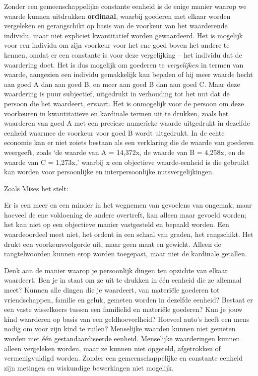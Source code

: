 Zonder een gemeenschappelijke constante eenheid is de enige manier waarop we waarde kunnen uitdrukken \textbf{ordinaal}, waarbij goederen met elkaar worden vergeleken en gerangschikt op basis van de voorkeur van het waarderende individu, maar niet expliciet kwantitatief worden gewaardeerd. Het is mogelijk voor een individu om zijn voorkeur voor het ene goed boven het andere te kennen, omdat er een constante is voor deze vergelijking – het individu dat de waardering doet. Het is dus mogelijk om goederen te \textit{vergelijken} in termen van waarde, aangezien een individu gemakkelijk kan bepalen of hij meer waarde hecht aan goed A dan aan goed B, en meer aan goed B dan aan goed C. Maar deze waardering is puur subjectief, uitgedrukt in verhouding tot het nut dat de persoon die het waardeert, ervaart. Het is onmogelijk voor de persoon om deze voorkeuren in kwantitatieve en kardinale termen uit te drukken, zoals het waarderen van goed A met een precieze numerieke waarde uitgedrukt in dezelfde eenheid waarmee de voorkeur voor goed B wordt uitgedrukt. In de echte economie kan er niet zoiets bestaan als een verklaring die de waarde van goederen weergeeft, zoals `de waarde van A = 14,372x, de waarde van B = 4,258x, en de waarde van C = 1,273x,' waarbij x een objectieve waarde-eenheid is die gebruikt kan worden voor persoonlijke en interpersoonlijke nutsvergelijkingen.

Zoals Mises het stelt:

\begin{blockquotebox}
    Er is een meer en een minder in het wegnemen van gevoelens van ongemak; maar hoeveel de ene voldoening de andere overtreft, kan alleen maar gevoeld worden; het kan niet op een objectieve manier vastgesteld en bepaald worden. Een waardeoordeel meet niet, het ordent in een schaal van graden, het rangschikt. Het drukt een voorkeursvolgorde uit, maar geen maat en gewicht. Alleen de rangtelwoorden kunnen erop worden toegepast, maar niet de kardinale getallen.\footnotemark
\end{blockquotebox}

Denk aan de manier waarop je persoonlijk dingen ten opzichte van elkaar waardeert. Ben je in staat om ze uit te drukken in één eenheid die ze allemaal meet? Kunnen alle dingen die je waardeert, van materiële goederen tot vriendschappen, familie en geluk, gemeten worden in dezelfde eenheid? Bestaat er een vaste wisselkoers tussen een familielid en materiële goederen? Kun je jouw kind waarderen op basis van een geldhoeveelheid? Hoeveel auto’s heeft een mens nodig om voor zijn kind te ruilen? Menselijke waarden kunnen niet gemeten worden met één gestandaardiseerde eenheid. Menselijke waarderingen kunnen alleen vergeleken worden, maar ze kunnen niet opgeteld, afgetrokken of vermenigvuldigd worden. Zonder een gemeenschappelijke en constante eenheid zijn metingen en wiskundige bewerkingen niet mogelijk.



